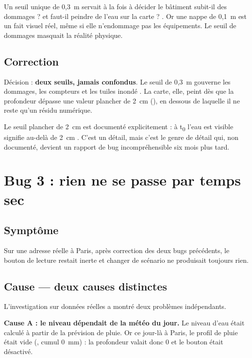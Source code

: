 Un seuil unique de 0,3~m servait à la fois à décider \og le bâtiment
subit-il des dommages ? \fg{} et \og faut-il peindre de l'eau sur la carte ? \fg.
Or une nappe de 0,1~m est un fait visuel réel, même si elle n'endommage pas
les équipements. Le seuil de dommages masquait la réalité physique.

\subsection{Correction}

Décision  : \textbf{deux seuils, jamais confondus}. Le seuil de
0,3~m gouverne les dommages, les compteurs et les tuiles \og inondé \fg. La
carte, elle, peint dès que la profondeur dépasse une valeur plancher de 2~cm
(), en dessous de laquelle il ne reste qu'un résidu
numérique.

\begin{honesty}
Le seuil plancher de 2~cm est documenté explicitement : \og à t\textsubscript{0}
l'eau est visible \fg{} signifie \og au-delà de 2~cm \fg. C'est un détail, mais
c'est le genre de détail qui, non documenté, devient un rapport de bug
incompréhensible six mois plus tard.
\end{honesty}

\section{Bug 3 : \og rien ne se passe \fg{} par temps sec}

\subsection{Symptôme}

Sur une adresse réelle à Paris, après correction des deux bugs précédents, le
bouton de lecture restait inerte et changer de scénario ne produisait toujours
rien.

\subsection{Cause — deux causes distinctes}

L'investigation sur données réelles a montré deux problèmes indépendants.

\textbf{Cause A : le niveau dépendait de la météo du jour.} Le niveau d'eau
était calculé à partir de la prévision de pluie. Or ce jour-là à Paris, le
profil de pluie était vide (, cumul 0~mm) : la profondeur
valait donc 0 et le bouton était désactivé.

